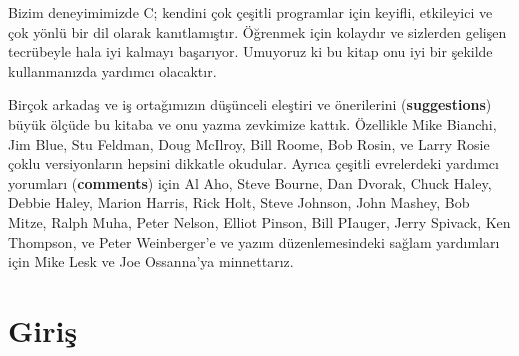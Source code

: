 \documentclass[a4paper,12pt,oneside]{book}
\begin{document}
\par Bizim deneyimimizde C; kendini çok çeşitli programlar için keyifli, etkileyici ve çok yönlü bir dil olarak kanıtlamıştır. Öğrenmek için kolaydır ve sizlerden gelişen tecrübeyle hala iyi kalmayı başarıyor. Umuyoruz ki bu kitap onu iyi bir şekilde kullanmanızda yardımcı olacaktır.
\thispagestyle{prefacetofe}
\par Birçok arkadaş ve iş ortağımızın düşünceli eleştiri ve önerilerini (\textbf{suggestions}) büyük ölçüde bu kitaba ve onu yazma zevkimize kattık. Özellikle Mike Bianchi, Jim Blue, Stu Feldman, Doug McIlroy, Bill Roome, Bob Rosin, ve Larry Rosie çoklu versiyonların hepsini dikkatle okudular. Ayrıca çeşitli evrelerdeki yardımcı yorumları (\textbf{comments}) için Al Aho, Steve Bourne, Dan Dvorak, Chuck Haley, Debbie Haley, Marion Harris, Rick Holt, Steve Johnson, John Mashey, Bob Mitze, Ralph Muha, Peter Nelson, Elliot Pinson, Bill PIauger, Jerry Spivack, Ken Thompson, ve Peter Weinberger'e ve yazım düzenlemesindeki sağlam yardımları için  Mike Lesk ve Joe Ossanna'ya minnettarız.

\noindent \hspace*{270pt}{Brian W. Kernighan \\}
\hspace*{280pt}{Dennis M. Ritchie}

\mainmatter

\chapter*{Giriş}
\end{document}
